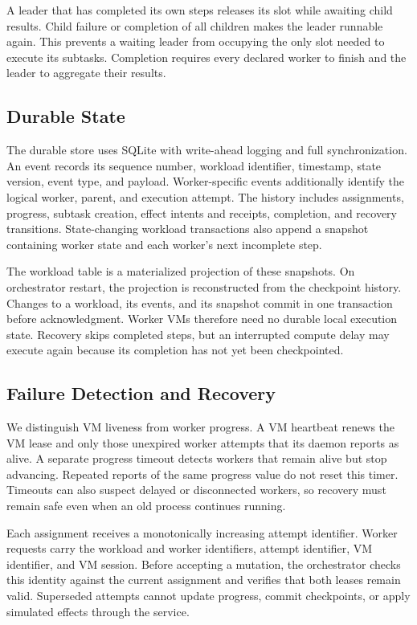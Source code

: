 A leader that has completed its own steps releases its slot while awaiting
child results. Child failure or completion of all children makes the leader
runnable again. This prevents a waiting leader from occupying the only slot
needed to execute its subtasks. Completion requires every declared worker to
finish and the leader to aggregate their results.

\subsection{Durable State}
\label{sec:durable-state}

The durable store uses SQLite with write-ahead logging and full synchronization.
An event records its sequence number, workload identifier, timestamp, state
version, event type, and payload. Worker-specific events additionally identify
the logical worker, parent, and execution attempt. The history includes
assignments, progress, subtask creation, effect intents and receipts, completion,
and recovery transitions. State-changing workload transactions also append a
snapshot containing worker state and each worker's next incomplete step.

The workload table is a materialized projection of these snapshots. On
orchestrator restart, the projection is reconstructed from the checkpoint
history. Changes to a workload, its events, and its snapshot commit in one
transaction before acknowledgment. Worker VMs therefore need no durable local
execution state. Recovery skips completed steps, but an interrupted compute
delay may execute again because its completion has not yet been checkpointed.

\subsection{Failure Detection and Recovery}
\label{sec:recovery}

We distinguish VM liveness from worker progress. A VM heartbeat renews the VM
lease and only those unexpired worker attempts that its daemon reports as
alive. A separate progress timeout detects workers that remain alive but stop
advancing. Repeated reports of the same progress value do not reset this timer.
Timeouts can also suspect delayed or disconnected workers, so recovery must
remain safe even when an old process continues running.

Each assignment receives a monotonically increasing attempt identifier.
Worker requests carry the workload and worker identifiers, attempt identifier,
VM identifier, and VM session. Before accepting a mutation, the orchestrator
checks this identity against the current assignment and verifies that both
leases remain valid. Superseded attempts cannot update progress, commit
checkpoints, or apply simulated effects through the service.

